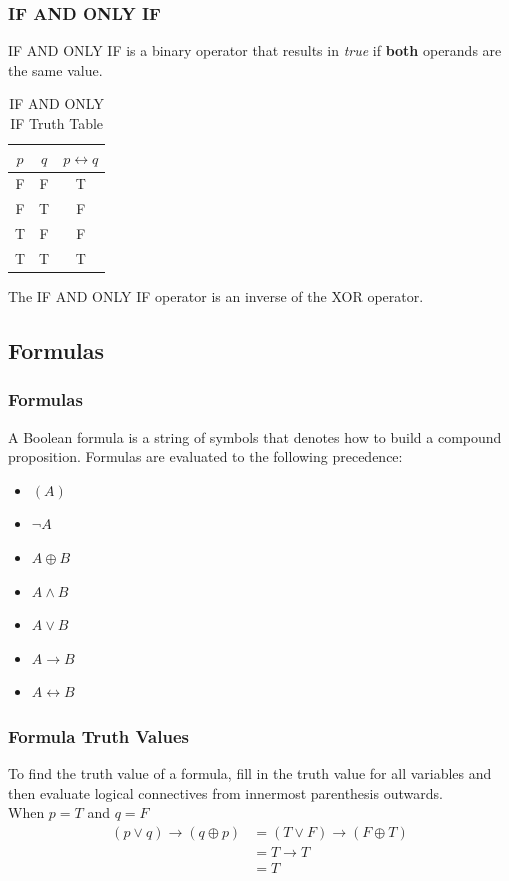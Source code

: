 \documentclass{article}
\begin{document}
\subsubsection{IF AND ONLY IF}
IF AND ONLY IF is a binary operator that results in \emph{true} if \textbf{both} operands are the same value.
\begin{table}[h]
    \centering
    \caption{IF AND ONLY IF Truth Table}
    \begin{tabular}{c|c|c}
        \(p\) & \(q\) & \(p \leftrightarrow q\) \\ \hline
        F     & F     & T              \\
        F     & T     & F              \\
        T     & F     & F              \\
        T     & T     & T              \\
    \end{tabular}
\end{table}
\begin{tcolorbox}[title=Note]
    The IF AND ONLY IF operator is an inverse of the XOR operator.
\end{tcolorbox}
%
\subsection{Formulas}
\subsubsection{Formulas}
A Boolean formula is a string of symbols that denotes how to build a compound proposition.
Formulas are evaluated to the following precedence:
\begin{itemize}
    \item \((A)\)
    \item \(\neg A\)
    \item \(A \oplus B\)
    \item \(A \wedge B\)
    \item \(A \vee B\)
    \item \(A \rightarrow B\)
    \item \(A \leftrightarrow B\)
\end{itemize}
%
\subsubsection{Formula Truth Values}
To find the truth value of a formula, fill in the truth value for all variables and then
evaluate logical connectives from innermost parenthesis outwards. \\
When \(p = T\) and \(q = F\)
\begin{align*}
    (p \vee q) \rightarrow (q \oplus p) & = (T \vee F) \rightarrow (F \oplus T) \\
                                        & = T \rightarrow T                     \\
                                        & = T
\end{align*}
%
\newpage
\end{document}
